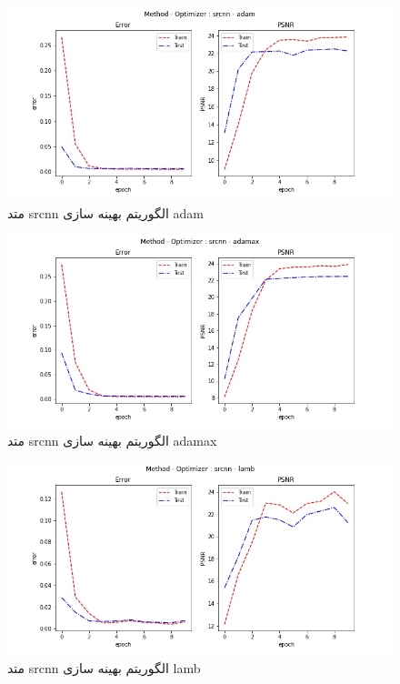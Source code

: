  \begin{figure}[!h] 
       \centering 
       \includegraphics[width=160mm]{./chapter3/images/error-psnr-srcnn-adam.jpg}
       \caption{متد srcnn الگوریتم بهینه سازی adam}
       \label{fig:error-psnr-srcnn-adam}
 \end{figure}
 \begin{figure}[!h] 
       \centering 
       \includegraphics[width=160mm]{./chapter3/images/error-psnr-srcnn-adamax.jpg}
       \caption{متد srcnn الگوریتم بهینه سازی adamax}
       \label{fig:error-psnr-srcnn-adamax}
 \end{figure}
 \begin{figure}[!h] 
       \centering 
       \includegraphics[width=160mm]{./chapter3/images/error-psnr-srcnn-lamb.jpg}
       \caption{متد srcnn الگوریتم بهینه سازی lamb}
       \label{fig:error-psnr-srcnn-lamb}
 \end{figure}
